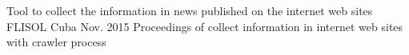 


\begin{cventries}


\cventry
{Tool to collect the information in news published on the internet web sites} %
{FLISOL} %
{Cuba} %
{Nov. 2015} %
{ %
Proceedings of collect information in internet web sites with crawler process
}


\end{cventries}
